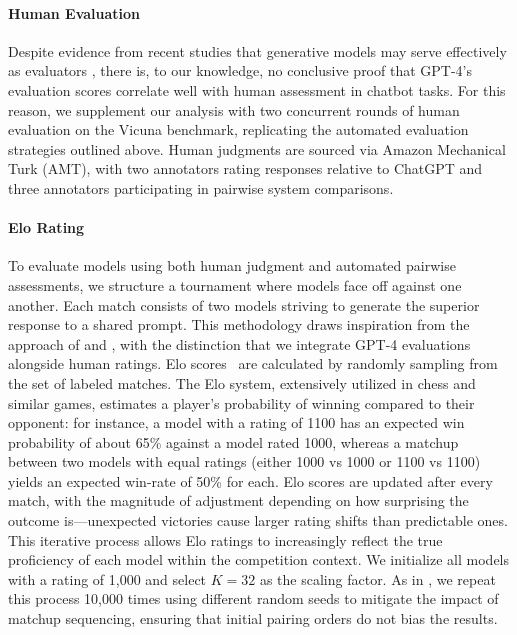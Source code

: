 \paragraph{Human Evaluation} Despite evidence from recent studies that generative models may serve effectively as evaluators \citep{fu2023gptscore}, there is, to our knowledge, no conclusive proof that GPT-4’s evaluation scores correlate well with human assessment in chatbot tasks. For this reason, we supplement our analysis with two concurrent rounds of human evaluation on the Vicuna benchmark, replicating the automated evaluation strategies outlined above. Human judgments are sourced via Amazon Mechanical Turk (AMT), with two annotators rating responses relative to ChatGPT and three annotators participating in pairwise system comparisons.

\paragraph{Elo Rating} To evaluate models using both human judgment and automated pairwise assessments, we structure a tournament where models face off against one another. Each match consists of two models striving to generate the superior response to a shared prompt. This methodology draws inspiration from the approach of \citet{bai2022training} and \citet{vicuna2023}, with the distinction that we integrate GPT-4 evaluations alongside human ratings. Elo scores~\citep{elo1967proposed,elo1978rating} are calculated by randomly sampling from the set of labeled matches. The Elo system, extensively utilized in chess and similar games, estimates a player's probability of winning compared to their opponent: for instance, a model with a rating of 1100 has an expected win probability of about 65\% against a model rated 1000, whereas a matchup between two models with equal ratings (either 1000 vs 1000 or 1100 vs 1100) yields an expected win-rate of 50\% for each. Elo scores are updated after every match, with the magnitude of adjustment depending on how surprising the outcome is—unexpected victories cause larger rating shifts than predictable ones. This iterative process allows Elo ratings to increasingly reflect the true proficiency of each model within the competition context. We initialize all models with a rating of 1,000 and select $K=32$ as the scaling factor. As in \citet{vicuna2023}, we repeat this process 10,000 times using different random seeds to mitigate the impact of matchup sequencing, ensuring that initial pairing orders do not bias the results.

